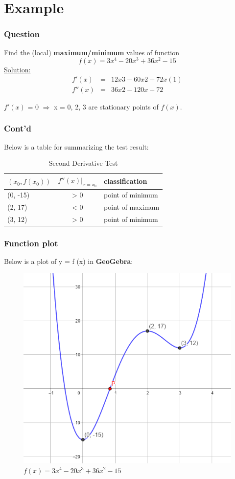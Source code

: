 \documentclass{beamer}
\begin{document}
\section{Example}
\begin{frame} %
\frametitle{Question}
Find the (local) \textbf{maximum/minimum} values of function
\begin{equation*}
f (x) = 3x^4 - 20x^3 + 36x^2 - 15
\end{equation*}
\underline{Solution:}
\begin{eqnarray}
f'(x) &=& 12x3 - 60x2 + 72x (1)\\
f''(x) &=& 36x2 - 120x + 72 
\end{eqnarray}

$f'(x)$ = 0 $\Rightarrow$ x = 0, 2, 3 are stationary points of $f (x)$.
\end{frame}
\begin{frame} %
\frametitle{Cont’d}
Below is a table for summarizing the test result:
\begin{table}\center\begin{tabular}{|l|c|l|}\hline
$(x_0, f (x_0))$ &$ f''(x)|_{x=x_0}$&classification\\\hline
(0, -15)&> 0&point of minimum\\\hline
(2, 17) &< 0& point of maximum\\\hline
(3, 12) &> 0& point of minimum\\\hline
\end{tabular}
\caption{Second Derivative Test}
\end{table}
\end{frame}
\begin{frame} %
\frametitle{Function plot}
Below is a plot of y = f (x) in \textbf{GeoGebra}:
\begin{figure}
\includegraphics[scale=0.4]{polynomial}
\caption{$f (x) = 3x^4 - 20x^3 + 36x^2 - 15$}
\end{figure}


\end{frame}
\end{document}
